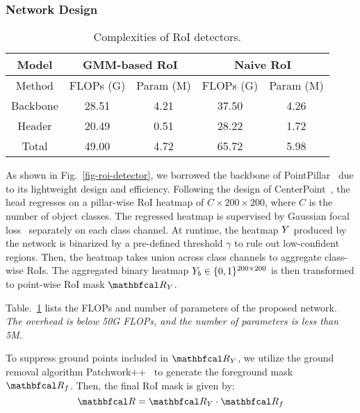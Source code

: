 \subsubsection{Network Design}


\begin{table}[t]
    \centering
    \renewcommand{\arraystretch}{\TABVSPACE} %
    \setlength{\tabcolsep}{2pt} %
    \caption{Complexities of RoI detectors.}
    \begin{tabular}{c|c|c|c|c}
    \hline
     Model      & \multicolumn{2}{c|}{GMM-based RoI} & \multicolumn{2}{c}{Naive RoI} \\
     
    \hline
    Method  & FLOPs (G) & Param (M) &  FLOPs (G) & Param (M)  \\ 
\cline{2-3}         \cline{4-5}
    \hline
        Backbone & 28.51 & 4.21 & 37.50 & 4.26 \\ 
        Header & 20.49 & 0.51 & 28.22 & 1.72 \\ 
        Total & 49.00 & 4.72 & 65.72 & 5.98 \\ 
    \hline
    \end{tabular}
    \label{tab-detector-capacity}
    \vspace{-0.4cm}
\end{table}


As shown in Fig.~\ref{fig-roi-detector}, we borrowed the backbone of PointPillar~\cite{lang2019pointpillars} due to its lightweight design and efficiency. Following the design of CenterPoint~\cite{yin2021center}, the head regresses on a pillar-wise RoI heatmap of $C\times200\times200$, where $C$ is the number of object classes. The regressed heatmap is supervised by Gaussian focal loss~\cite{law2018cornernet} separately on each class channel. 
At runtime, the heatmap ${Y}$ produced by the network is binarized by a pre-defined threshold $\gamma$ to rule out low-confident regions. Then, the heatmap takes union across class channels to aggregate class-wise RoIs. The aggregated binary heatmap ${Y}_b\in \{0,1\}^{200\times200}$ is then transformed to point-wise RoI mask $\roimaskpc_\heatmap$. 

Table.~\ref{tab-detector-capacity} lists the FLOPs and number of parameters of the proposed network. \textit{The overhead is below 50G FLOPs, and the number of parameters is less than 5M.} 

To suppress ground points included in $\roimaskpc_\heatmap$, we utilize the ground removal algorithm Patchwork++~\cite{lee2022patchworkpp} to generate the foreground mask $\roimaskpc_{f}$. Then, the final RoI mask is given by:
\begin{equation}
    \roimaskpc=\roimaskpc_\heatmap \cdot \roimaskpc_{f}
\end{equation}

